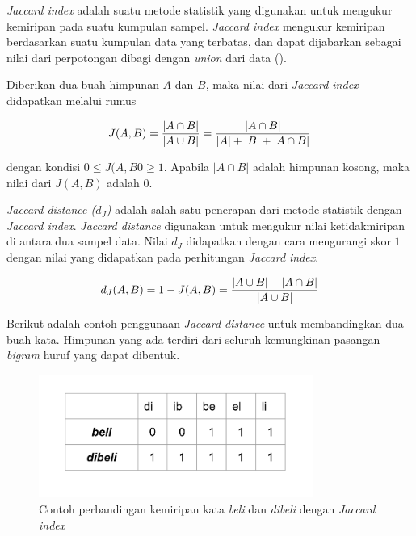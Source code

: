 \textit{Jaccard index} adalah suatu metode statistik yang digunakan untuk
mengukur kemiripan pada suatu kumpulan sampel. \textit{Jaccard index} mengukur
kemiripan berdasarkan suatu kumpulan data yang terbatas, dan dapat dijabarkan
sebagai nilai dari perpotongan dibagi dengan \textit{union} dari data
(\cite{jaccard1912distribution}).

Diberikan dua buah himpunan $A$ dan $B$, maka nilai dari \textit{Jaccard index}
didapatkan melalui rumus

\begin{equation}
  J(A,B)={{|A\cap B|} \over {|A\cup B|}} = {{|A\cap B|} \over {|A| + |B| + |A\cap B|}}
\end{equation}

dengan kondisi $0 \le J(A,B0 \ge 1$. Apabila $|A\cap B|$ adalah himpunan kosong, 
maka nilai dari $J(A,B)$ adalah $0$.

\textit{Jaccard distance ($d_{J}$)} adalah salah satu penerapan dari metode
statistik dengan \textit{Jaccard index}. \textit{Jaccard distance} digunakan
untuk mengukur nilai ketidakmiripan di antara dua sampel data. Nilai $d_{J}$
didapatkan dengan cara mengurangi skor $1$ dengan nilai yang didapatkan pada
perhitungan \textit{Jaccard index}.

\begin{equation}
  d_{J}(A,B)= 1 - J(A,B) = {{|A\cup B|} - {|A\cap B|} \over {|A\cup B|}}
\end{equation}

Berikut adalah contoh penggunaan \textit{Jaccard distance} untuk membandingkan
dua buah kata. Himpunan yang ada terdiri dari seluruh kemungkinan pasangan
\textit{bigram} huruf yang dapat dibentuk.

\begin{figure}[H]
  \centering{}
	\includegraphics[width=0.8\textwidth]{gambar/contoh-jaccard}
  \caption{Contoh perbandingan kemiripan kata \textit{beli} dan \textit{dibeli} dengan
  \textit{Jaccard index}}
\end{figure}

